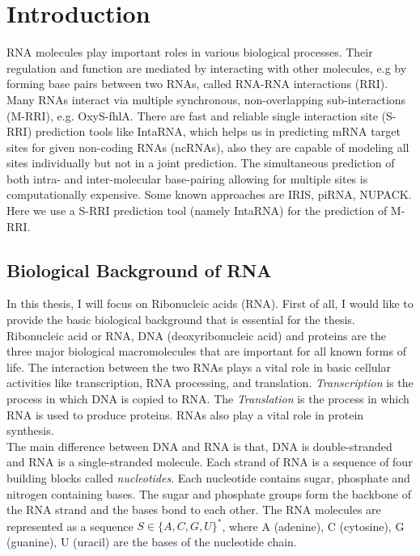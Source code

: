 \documentclass[twoside,a4paper]{report}
\numberwithin{equation}{section}
\begin{document}
	\chapter{Introduction}
	RNA molecules play important roles in various biological processes. Their regulation and function are mediated by interacting with other molecules, e.g by forming base pairs between two RNAs, called RNA-RNA interactions (RRI).  Many RNAs interact via multiple synchronous, non-overlapping sub-interactions (M-RRI), e.g. OxyS-fhlA. There are fast and reliable single interaction site (S-RRI) prediction tools like IntaRNA, which helps us in predicting mRNA target sites for given non-coding RNAs (ncRNAs), also they are capable of modeling all sites individually but not in a joint prediction. The simultaneous prediction of both intra- and inter-molecular base-pairing allowing for multiple sites is computationally expensive. Some known approaches are IRIS, piRNA, NUPACK. Here we use a S-RRI prediction tool (namely IntaRNA) for the prediction of M-RRI.
	
	\section{Biological Background of RNA}
	In this thesis, I will focus on Ribonucleic acids (RNA). First of all, I would like to provide the basic biological background that is essential for the thesis. Ribonucleic acid or RNA, DNA (deoxyribonucleic acid) and proteins are the three major biological macromolecules that are important for all known forms of life. The interaction between the two RNAs plays a vital role in basic cellular activities like transcription, RNA processing, and translation. \textit{Transcription} is the process in which DNA is copied to RNA. The \textit{Translation} is the process in which RNA is used to produce proteins. RNAs also play a vital role in protein synthesis. \\
	
	 The main difference between DNA and RNA is that, DNA is double-stranded and RNA is a single-stranded molecule. Each strand of RNA is a sequence of four building blocks called \textit{nucleotides}. Each nucleotide contains sugar, phosphate and nitrogen containing bases. The sugar and phosphate groups form the backbone of the RNA strand and the bases bond to each other. The RNA molecules are represented as a sequence $S \in \{A, C, G, U\} ^*$, where A (adenine), C (cytosine), G (guanine), U (uracil) are the bases of the nucleotide chain.\\
	 
\end{document}
